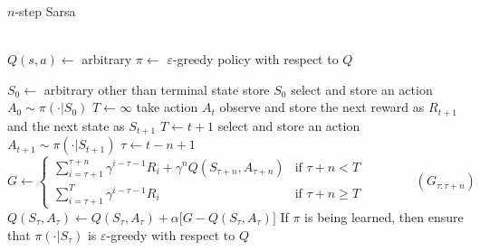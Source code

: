 \documentclass[../../main.tex]{subfiles}
\begin{document}
        {$n$-step Sarsa}
        {\inputitem{$\alpha \in (0,1]$}{step size parameter}\\
        \\
        }
        {}
        {
            {
                $Q(s,a) \leftarrow$ arbitrary\;
            }
            $\pi \leftarrow$ $\varepsilon$-greedy policy with respect to $Q$\;
            
            {
                $S_0 \leftarrow$ arbitrary other than terminal state\;
                store $S_0$\;
                select and store an action $A_0 \sim \pi(\cdot|S_0)$\;
                $T \leftarrow \infty$\;
                {
                    {
                        take action $A_t$\;
                        observe and store the next reward as $R_{t+1}$ and the next state as $S_{t+1}$\;
                        {
                            $T \leftarrow t+1$\;
                        }
                        {
                            select and store an action $A_{t+1} \sim \pi(\cdot|S_{t+1})$\;
                        }
                    }
                    $\tau \leftarrow t - n + 1$\;
                    {
                        $G \leftarrow
                        \begin{cases}
                            \sum_{i=\tau + 1}^{\tau + n} \gamma^{i-\tau-1}R_i + \gamma^n Q(S_{\tau + n},A_{\tau+n}) &\text{if $\tau + n < T$}\\
                            \sum_{i=\tau + 1}^T \gamma^{i-\tau-1}R_i &\text{if $\tau + n \geq T$}
                        \end{cases}\qquad\qquad(G_{\tau:\tau+n})$\;
                        $Q(S_\tau,A_\tau) \leftarrow Q(S_\tau,A_\tau) + \alpha \big[ G - Q(S_\tau,A_\tau) \big]$\;
                        If $\pi$ is being learned, then ensure that $\pi(\cdot|S_\tau)$ is $\varepsilon$-greedy with respect to $Q$\;
                    }
                }
            }
        }
\end{document}
